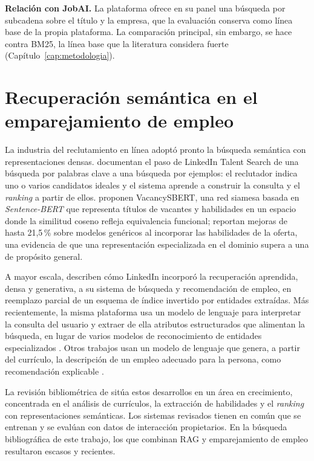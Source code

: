 \textbf{Relación con JobAI.} La plataforma ofrece en su panel una búsqueda por subcadena sobre el título y la empresa, que la evaluación conserva como línea base de la propia plataforma. La comparación principal, sin embargo, se hace contra BM25, la línea base que la literatura considera fuerte (Capítulo~\ref{cap:metodologia}).

\section{Recuperación semántica en el emparejamiento de empleo}
\label{sec:estado-arte-empleo}

La industria del reclutamiento en línea adoptó pronto la búsqueda semántica con representaciones densas. \citet{HaThuc2017} documentan el paso de LinkedIn Talent Search de una búsqueda por palabras clave a una búsqueda por ejemplos: el reclutador indica uno o varios candidatos ideales y el sistema aprende a construir la consulta y el \textit{ranking} a partir de ellos. \citet{Bocharova2023} proponen VacancySBERT, una red siamesa basada en \textit{Sentence-BERT} que representa títulos de vacantes y habilidades en un espacio donde la similitud coseno refleja equivalencia funcional; reportan mejoras de hasta 21,5\,\% sobre modelos genéricos al incorporar las habilidades de la oferta, una evidencia de que una representación especializada en el dominio supera a una de propósito general.

A mayor escala, \citet{Shen2024} describen cómo LinkedIn incorporó la recuperación aprendida, densa y generativa, a su sistema de búsqueda y recomendación de empleo, en reemplazo parcial de un esquema de índice invertido por entidades extraídas. Más recientemente, la misma plataforma usa un modelo de lenguaje para interpretar la consulta del usuario y extraer de ella atributos estructurados que alimentan la búsqueda, en lugar de varios modelos de reconocimiento de entidades especializados \citep{Liu2025}. Otros trabajos usan un modelo de lenguaje que genera, a partir del currículo, la descripción de un empleo adecuado para la persona, como recomendación explicable \citep{ZhengGIRL2023}.

La revisión bibliométrica de \citet{RojasGaleano2022} sitúa estos desarrollos en un área en crecimiento, concentrada en el análisis de currículos, la extracción de habilidades y el \textit{ranking} con representaciones semánticas. Los sistemas revisados tienen en común que se entrenan y se evalúan con datos de interacción propietarios. En la búsqueda bibliográfica de este trabajo, los que combinan RAG y emparejamiento de empleo resultaron escasos y recientes.


